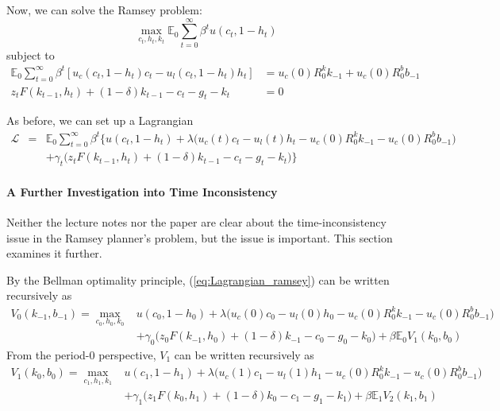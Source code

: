 \documentclass[12pt]{article}
\newcommand{\E}{\mathbb{E}}
\begin{document}
	\noindent
	Now, we can solve the Ramsey problem:
	\begin{equation*}
		\max_{c_t, h_t, k_t} \E_0 \sum_{t=0}^\infty \beta^t u(c_t, 1-h_t)
	\end{equation*}
	subject to
	\begin{align}
		\E_0 \sum_{t=0}^\infty \beta^t[u_c(c_t, 1-h_t)c_t - u_l(c_t, 1-h_t)h_t] &= u_c(0)R_0^k k_{-1} + u_c(0)R_0^b b_{-1} \label{eq:PVIC}\\
		z_t F(k_{t-1}, h_t) + (1-\delta)k_{t-1} - c_t - g_t - k_t &= 0 \label{eq:RC}
	\end{align}

As before, we can set up a Lagrangian
\begin{eqnarray}
\mathcal{L} & = &\E_0 \sum_{t=0}^\infty \beta^t\Big\{ u(c_t, 1-h_t) + \lambda \big(u_c(t)c_t - u_l(t)h_t - u_c(0) R_0^k k_{-1} - u_c(0) R_0^b b_{-1} \big) \nonumber\\ & & + \gamma_t \big(z_t F(k_{t-1}, h_t) + (1-\delta)k_{t-1} - c_t - g_t - k_t \big)  \Big\} \label{eq:Lagrangian_ramsey}
\end{eqnarray}

\paragraph{A Further Investigation into Time Inconsistency \\ [6pt]}
Neither the lecture notes nor the paper are clear about the time-inconsistency issue in the Ramsey planner's problem, but the issue is important. This section examines it further.

By the Bellman optimality principle, (\ref{eq:Lagrangian_ramsey}) can be written recursively as
\begin{align}
	V_0(k_{-1}, b_{-1}) = \max_{c_0, h_0, k_0} & u(c_0, 1-h_0) + \lambda \big(u_c(0)c_0 - u_l(0)h_0 - u_c(0) R_0^k k_{-1} - u_c(0) R_0^b b_{-1} \big) \nonumber \\ & + \gamma_0 \big(z_0 F(k_{-1}, h_0) + (1-\delta)k_{-1} - c_0 - g_0 - k_0 \big) + \beta \E_0 V_1(k_0, b_0) \label{eq:bellman_period0}
\end{align} 
From the period-0 perspective, $V_1$ can be written recursively as
\begin{align}
	V_1(k_{0}, b_{0}) = \max_{c_1, h_1, k_1} & u(c_1, 1-h_1) + \lambda \big(u_c(1)c_1 - u_l(1)h_1 - u_c(0) R_0^k k_{-1} - u_c(0) R_0^b b_{-1} \big) \nonumber \\ & + \gamma_1 \big(z_1 F(k_{0}, h_1) + (1-\delta)k_{0} - c_1 - g_1 - k_1 \big) + \beta \E_1 V_2(k_1, b_1) \label{eq:bellman_period1_from0}
\end{align}
\end{document}
